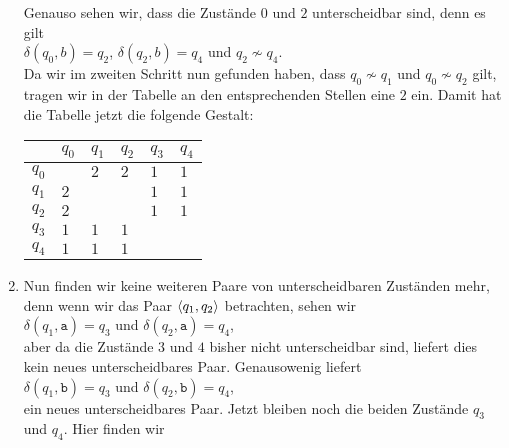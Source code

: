 \begin{enumerate}
      Genauso sehen wir, dass die Zust\"ande $0$ und $2$ unterscheidbar sind, 
      denn es gilt 
      \\[0.2cm]
      \hspace*{1.3cm}
      $\delta(q_0,b) = q_2$, \quad $\delta(q_2,b) = q_4$ \quad und \quad $q_2 \not\sim q_4$.
      \\[0.2cm]
      Da wir im zweiten Schritt nun gefunden haben, dass
      $q_0 \not\sim q_1$ und $q_0 \not\sim q_2$ gilt, tragen wir in der Tabelle an den
      entsprechenden Stellen eine $2$ ein. Damit hat die Tabelle
      jetzt die folgende Gestalt:
      \begin{center}        
      \begin{tabular}[t]{|l||l|l|l|l|l|}
      \hline
        & $q_0$      &      $q_1$ &      $q_2$ &      $q_3$ &      $q_4$  \\
      \hline
      \hline
      $q_0$ &          &$2$ &$2$ &$1$ &$1$  \\
      \hline
      $q_1$ &$2$ &          &          &$1$ &$1$  \\
      \hline
      $q_2$ &$2$ &          &          &$1$ &$1$  \\
      \hline
      $q_3$ &$1$ &$1$ &$1$ &          &           \\
      \hline
      $q_4$ &$1$ &$1$ &$1$ &          &           \\
      \hline
      \end{tabular}
      \end{center}
\item Nun finden wir keine weiteren Paare von unterscheidbaren Zust\"anden mehr,
      denn wenn wir das Paar $\pair(q_1,q_2)$ betrachten, sehen wir
      \\[0.2cm]
      \hspace*{1.3cm}
      $\delta(q_1,\texttt{a}) = q_3$ \quad und \quad $\delta(q_2,\texttt{a}) = q_4$, 
      \\[0.2cm]
      aber da die Zust\"ande $3$ und $4$ bisher nicht unterscheidbar sind,
      liefert dies kein neues unterscheidbares Paar.  Genausowenig liefert
      \\[0.2cm]
      \hspace*{1.3cm}
      $\delta(q_1,\texttt{b}) = q_3$ \quad und \quad $\delta(q_2,\texttt{b}) = q_4$, 
      \\[0.2cm]
      ein neues unterscheidbares Paar.  Jetzt bleiben noch die beiden Zust\"ande
      $q_3$ und $q_4$.  Hier finden wir
      \\[0.2cm]
      \hspace*{1.3cm}

\end{enumerate}
